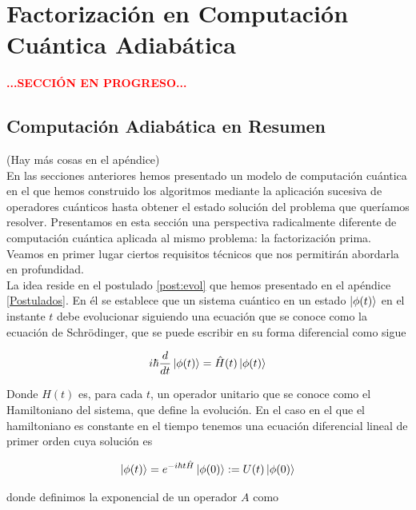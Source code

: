 \documentclass[11pt, spanish]{report}
\newcommand{\red}[1]{\textcolor{red}{#1}}
\numberwithin{equation}{section}
\numberwithin{defin}{section}
\begin{document}
\chapter{Factorización en Computación Cuántica Adiabática} \label{seq:adiabatica}
\begin{center}
\red{\textbf{...SECCIÓN EN PROGRESO...}}
\end{center}

\section{Computación Adiabática en Resumen}\label{AQCBrief}

(Hay más cosas en el apéndice)\\

En las secciones anteriores hemos presentado un modelo de computación cuántica en el que hemos construido los algoritmos mediante la aplicación sucesiva de operadores cuánticos hasta obtener el estado solución del problema que queríamos resolver. Presentamos en esta sección una perspectiva radicalmente diferente de computación cuántica aplicada al mismo problema: la factorización prima. Veamos en primer lugar ciertos requisitos técnicos que nos permitirán abordarla en profundidad.\\

La idea reside en el postulado \ref{post:evol} que hemos presentado en el apéndice \ref{Postulados}. En él se establece que un sistema cuántico en un estado $\ket{\phi(t)}$ en el instante $t$ debe evolucionar siguiendo una ecuación que se conoce como la ecuación de Schrödinger, que se puede escribir en su forma diferencial como sigue

\begin{equation}\label{mySchr}
i\hbar\frac{d}{d t}\ket{\phi(t)}=\hat{H}(t)\ket{\phi(t)}
\end{equation}

Donde $H(t)$ es, para cada $t$, un operador unitario que se conoce como el Hamiltoniano del sistema, que define la evolución. En el caso en el que el hamiltoniano es constante en el tiempo tenemos una ecuación diferencial lineal de primer orden cuya solución es

\begin{equation}\label{expEv}
\ket{\phi(t)}=e^{-i\hbar t\hat{H}}\ket{\phi(0)}:=U(t)\ket{\phi(0)}
\end{equation}

donde definimos la exponencial de un operador $A$ como
\end{document}
